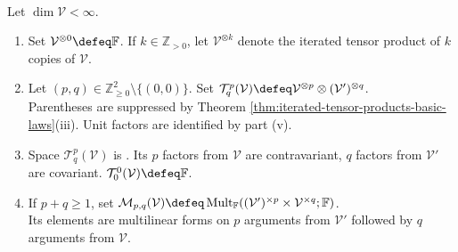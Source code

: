 \begin{definition} \label{def:tensor-spaces-type-pq} \\
Let $\dim\mathcal{V}<\infty$.
\begin{enumerate}[label=(\roman*)]
\setlength{\itemsep}{0pt}
\item Set $\mathcal{V}^{\otimes0}\defeq\mathbb{F}$. If $k\in\mathbb{Z}_{>0}$, let $\mathcal{V}^{\otimes k}$ denote the iterated tensor product of $k$ copies of $\mathcal{V}$.
\item Let $(p,q)\in\mathbb{Z}_{\geq0}^{2}\setminus\{(0,0)\}$. Set $\mathcal{T}^{p}_{q}(\mathcal{V})\defeq\mathcal{V}^{\otimes p}\otimes(\mathcal{V}')^{\otimes q}$.\\
Parentheses are suppressed by Theorem \ref{thm:iterated-tensor-products-basic-laws}(iii). Unit factors are identified by part (v).
\item Space $\mathcal{T}^{p}_{q}(\mathcal{V})$ is . Its $p$ factors from $\mathcal{V}$ are contravariant, $q$ factors from $\mathcal{V}'$ are covariant. $\mathcal{T}^{0}_{0}(\mathcal{V})\defeq\mathbb{F}$.
\item If $p+q\geq1$, set $\mathcal{M}_{p,q}(\mathcal{V})\defeq\operatorname{Mult}_{\mathbb{F}}((\mathcal{V}')^{\times p}\times\mathcal{V}^{\times q};\mathbb{F})$.\\
Its elements are multilinear forms on $p$ arguments from $\mathcal{V}'$ followed by $q$ arguments from $\mathcal{V}$.
\end{enumerate}
\end{definition}

